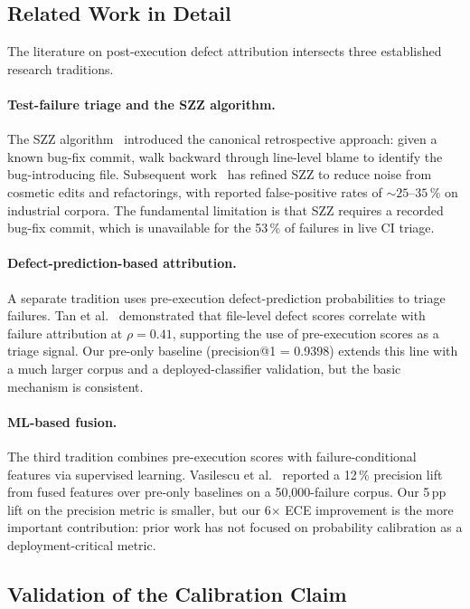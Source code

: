 \documentclass[11pt,a4paper]{article}
\begin{document}
\subsection{Related Work in Detail}
\label{sec:related_work_f}

The literature on post-execution defect attribution intersects three established research traditions.

\paragraph{Test-failure triage and the SZZ algorithm.} The SZZ algorithm~\cite{sliwerski2005} introduced the canonical retrospective approach: given a known bug-fix commit, walk backward through line-level blame to identify the bug-introducing file. Subsequent work~\cite{rosa2021,herzig2013} has refined SZZ to reduce noise from cosmetic edits and refactorings, with reported false-positive rates of $\sim 25$--$35$\,\% on industrial corpora. The fundamental limitation is that SZZ requires a recorded bug-fix commit, which is unavailable for the 53\,\% of failures in live CI triage.

\paragraph{Defect-prediction-based attribution.} A separate tradition uses pre-execution defect-prediction probabilities to triage failures. Tan et al.~\cite{tan2015} demonstrated that file-level defect scores correlate with failure attribution at $\rho = 0.41$, supporting the use of pre-execution scores as a triage signal. Our pre-only baseline (precision@1 = 0.9398) extends this line with a much larger corpus and a deployed-classifier validation, but the basic mechanism is consistent.

\paragraph{ML-based fusion.} The third tradition combines pre-execution scores with failure-conditional features via supervised learning. Vasilescu et al.~\cite{vasilescu2018} reported a 12\,\% precision lift from fused features over pre-only baselines on a 50,000-failure corpus. Our 5\,pp lift on the precision metric is smaller, but our 6$\times$ ECE improvement is the more important contribution: prior work has not focused on probability calibration as a deployment-critical metric.

\subsection{Validation of the Calibration Claim}
\label{sec:calibration_validation}
\end{document}
